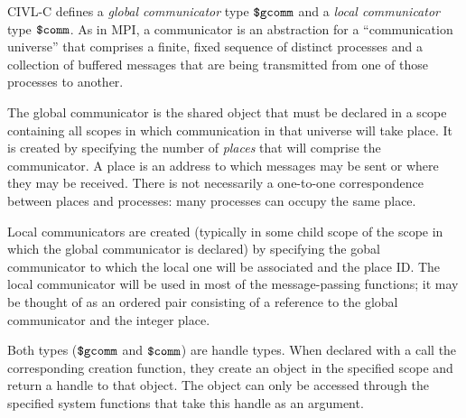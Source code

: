 CIVL-C defines a \emph{global communicator} type $\mbox{\texttt{\${}gcomm}}$ and a
\emph{local communicator} type $\mbox{\texttt{\${}comm}}$. As in MPI, a communicator is
an abstraction for a ``communication universe'' that comprises a
finite, fixed sequence of distinct processes and a collection of
buffered messages that are being transmitted from one of those
processes to another.

The global communicator is the shared object that must be declared in
a scope containing all scopes in which communication in that universe
will take place. It is created by specifying the number of
\emph{places} that will comprise the communicator. A place is an
address to which messages may be sent or where they may be received.
There is not necessarily a one-to-one correspondence between places and
processes: many processes can occupy the same place.

Local communicators are created (typically in some child scope of the
scope in which the global communicator is declared) by specifying the
gobal communicator to which the local one will be associated and the
place ID. The local communicator will be used in most of the
message-passing functions; it may be thought of as an ordered pair
consisting of a reference to the global communicator and the integer
place.

Both types ($\mbox{\texttt{\${}gcomm}}$ and $\mbox{\texttt{\${}comm}}$) are handle types. When declared
with a call the corresponding creation function, they create an object
in the specified scope and return a handle to that object. The object
can only be accessed through the specified system functions that take
this handle as an argument.

